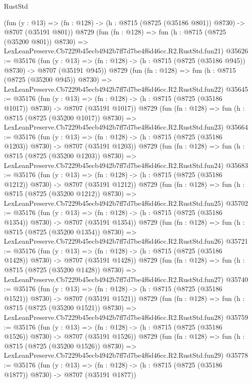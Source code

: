 \begin{lexlean}{RustStd}
\begin{coremodule}
    (fun (y : @13) => (fn : @128) -> (h : @8715 (@8725 (@35186 @801)) @8730) -> @8707 (@35191 @801))
    @8729
    (fun (fn : @128) =>
    fun (h : @8715 (@8725 (@35200 @801)) @8730) =>
    LexLeanPreserve.Cb7229b45ecb4942b7ff7d7be4f6d46cc.R2.RustStd.fun21)
@35626 := @35176
    (fun (y : @13) => (fn : @128) -> (h : @8715 (@8725 (@35186 @945)) @8730) -> @8707 (@35191 @945))
    @8729
    (fun (fn : @128) =>
    fun (h : @8715 (@8725 (@35200 @945)) @8730) =>
    LexLeanPreserve.Cb7229b45ecb4942b7ff7d7be4f6d46cc.R2.RustStd.fun22)
@35645 := @35176
    (fun (y : @13) =>
    (fn : @128) -> (h : @8715 (@8725 (@35186 @1017)) @8730) -> @8707 (@35191 @1017))
    @8729
    (fun (fn : @128) =>
    fun (h : @8715 (@8725 (@35200 @1017)) @8730) =>
    LexLeanPreserve.Cb7229b45ecb4942b7ff7d7be4f6d46cc.R2.RustStd.fun23)
@35664 := @35176
    (fun (y : @13) =>
    (fn : @128) -> (h : @8715 (@8725 (@35186 @1203)) @8730) -> @8707 (@35191 @1203))
    @8729
    (fun (fn : @128) =>
    fun (h : @8715 (@8725 (@35200 @1203)) @8730) =>
    LexLeanPreserve.Cb7229b45ecb4942b7ff7d7be4f6d46cc.R2.RustStd.fun24)
@35683 := @35176
    (fun (y : @13) =>
    (fn : @128) -> (h : @8715 (@8725 (@35186 @1212)) @8730) -> @8707 (@35191 @1212))
    @8729
    (fun (fn : @128) =>
    fun (h : @8715 (@8725 (@35200 @1212)) @8730) =>
    LexLeanPreserve.Cb7229b45ecb4942b7ff7d7be4f6d46cc.R2.RustStd.fun25)
@35702 := @35176
    (fun (y : @13) =>
    (fn : @128) -> (h : @8715 (@8725 (@35186 @1354)) @8730) -> @8707 (@35191 @1354))
    @8729
    (fun (fn : @128) =>
    fun (h : @8715 (@8725 (@35200 @1354)) @8730) =>
    LexLeanPreserve.Cb7229b45ecb4942b7ff7d7be4f6d46cc.R2.RustStd.fun26)
@35721 := @35176
    (fun (y : @13) =>
    (fn : @128) -> (h : @8715 (@8725 (@35186 @1428)) @8730) -> @8707 (@35191 @1428))
    @8729
    (fun (fn : @128) =>
    fun (h : @8715 (@8725 (@35200 @1428)) @8730) =>
    LexLeanPreserve.Cb7229b45ecb4942b7ff7d7be4f6d46cc.R2.RustStd.fun27)
@35740 := @35176
    (fun (y : @13) =>
    (fn : @128) -> (h : @8715 (@8725 (@35186 @1521)) @8730) -> @8707 (@35191 @1521))
    @8729
    (fun (fn : @128) =>
    fun (h : @8715 (@8725 (@35200 @1521)) @8730) =>
    LexLeanPreserve.Cb7229b45ecb4942b7ff7d7be4f6d46cc.R2.RustStd.fun28)
@35759 := @35176
    (fun (y : @13) =>
    (fn : @128) -> (h : @8715 (@8725 (@35186 @1526)) @8730) -> @8707 (@35191 @1526))
    @8729
    (fun (fn : @128) =>
    fun (h : @8715 (@8725 (@35200 @1526)) @8730) =>
    LexLeanPreserve.Cb7229b45ecb4942b7ff7d7be4f6d46cc.R2.RustStd.fun29)
@35778 := @35176
    (fun (y : @13) =>
    (fn : @128) -> (h : @8715 (@8725 (@35186 @1877)) @8730) -> @8707 (@35191 @1877))

\end{coremodule}
\end{lexlean}
